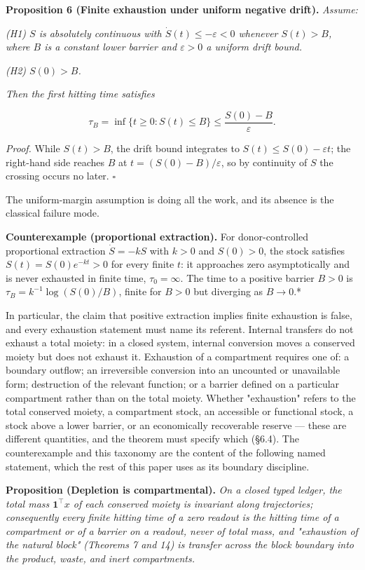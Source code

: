 \documentclass[11pt]{article}
\begin{document}
\textbf{Proposition 6 (Finite exhaustion under uniform negative drift).} \emph{Assume:}

\emph{(H1) \(S\) is absolutely continuous with \(\dot S(t) \le -\varepsilon < 0\) whenever \(S(t) > B\), where \(B\) is a constant lower barrier and \(\varepsilon > 0\) a uniform drift bound.}

\emph{(H2) \(S(0) > B\).}

\emph{Then the first hitting time satisfies} 

$$\tau_B = \inf\{ t \ge 0 : S(t) \le B \} \le \frac{S(0) - B}{\varepsilon}.$$



\emph{Proof.} While \(S(t) > B\), the drift bound integrates to \(S(t) \le S(0) - \varepsilon t\); the right-hand side reaches \(B\) at \(t = (S(0) - B)/\varepsilon\), so by continuity of \(S\) the crossing occurs no later. \(\square\)

The uniform-margin assumption is doing all the work, and its absence is the classical failure mode.

\textbf{Counterexample (proportional extraction).} For donor-controlled proportional extraction \(\dot S=-kS\) with \(k>0\) and \(S(0)>0\), the stock satisfies \(S(t)=S(0)e^{-kt}>0\) for every finite \(t\): it approaches zero asymptotically and is never exhausted in finite time, \(\tau_0=\infty\). The time to a positive barrier \(B > 0\) is \(\tau_B = k^{-1}\log(S(0)/B)\), finite for \(B > 0\) but diverging as \(B \to 0\).*

In particular, the claim that positive extraction implies finite exhaustion is false, and every exhaustion statement must name its referent. Internal transfers do not exhaust a total moiety: in a closed system, internal conversion moves a conserved moiety but does not exhaust it. Exhaustion of a compartment requires one of: a boundary outflow; an irreversible conversion into an uncounted or unavailable form; destruction of the relevant function; or a barrier defined on a particular compartment rather than on the total moiety. Whether "exhaustion" refers to the total conserved moiety, a compartment stock, an accessible or functional stock, a stock above a lower barrier, or an economically recoverable reserve --- these are different quantities, and the theorem must specify which (\S6.4). The counterexample and this taxonomy are the content of the following named statement, which the rest of this paper uses as its boundary discipline.

\textbf{Proposition (Depletion is compartmental).} \emph{On a closed typed ledger, the total mass \(\mathbf{1}^\top x\) of each conserved moiety is invariant along trajectories; consequently every finite hitting time of a zero readout is the hitting time of a compartment or of a barrier on a readout, never of total mass, and "exhaustion of the natural block" (Theorems 7 and 14) is transfer across the block boundary into the product, waste, and inert compartments.}
\end{document}
